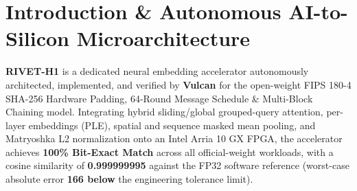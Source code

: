 \documentclass[11pt,a4paper]{article}
\begin{document}
\section{Introduction \& Autonomous AI-to-Silicon Microarchitecture}

\textbf{RIVET-H1} is a dedicated neural embedding accelerator autonomously architected, implemented, and verified by \textbf{Vulcan} for the open-weight FIPS 180-4 SHA-256 Hardware Padding,\allowbreak{} 64-Round Message Schedule \& Multi-Block Chaining model. Integrating hybrid sliding/global grouped-query attention, per-layer embeddings (PLE), spatial and sequence masked mean pooling, and Matryoshka L2 normalization onto an Intel Arria 10 GX FPGA, the accelerator achieves \textbf{100\% Bit-Exact Match} across all official-weight workloads, with a cosine similarity of \textbf{0.999999995} against the FP32 software reference (worst-case absolute error \textbf{166\texttimes{} below} the engineering tolerance limit).

\vspace{2pt}
\end{document}
